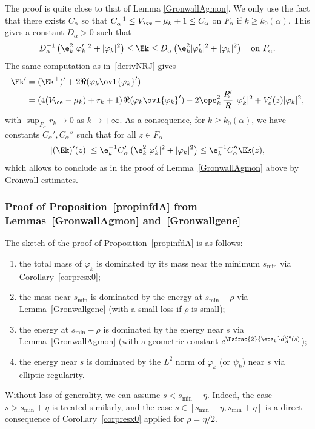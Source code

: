 \bnp
The proof is quite close to that of Lemma \ref{GronwallAgmon}. We only use the fact that there exists $C_{\alpha}$ so that $C_{\alpha}^{-1}\leq V_\ce -\mu_k+1\leq C_{\alpha}$ on $F_\alpha$ if $k\geq k_{0}(\alpha)$. This gives a constant $D_\alpha>0$ such that
\[
D_{\alpha}^{-1} \left( \e_k^{2}|\varphi_k'|^{2}+|\varphi_k|^{2}\right)\leq \Ek\leq D_{\alpha} \left(\e_k^{2} |\varphi_k'|^{2}+|\varphi_k|^{2}\right)\quad \text{on }F_\alpha.
\]
The same computation as in~\eqref{derivNRJ} gives
\begin{align*}
\Ek'& =(\Ek^+)'+2\Re(\varphi_k \ovl{\varphi_k}' ) \\
& =\left(4(V_{\ce} -\mu_k) + r_k+1\right) \Re(\varphi_k \ovl{\varphi_k}' ) - 2\eps_k^2\, \frac{R'}{R}\,|\varphi_k'|^2+ V'_c(z)|\varphi_k|^2,
\end{align*}
with $\sup_{F_\alpha}r_k \to 0$ as $k \to+ \infty$.
As a consequence, for $k\geq k_{0}(\alpha)$, we have constants $C_\alpha',C_\alpha''$ such that for all $z\in F_\alpha$
\[
|(\Ek)'(z)|\leq \e_k^{-1}C_{\alpha}' \left(\e_k^{2} |\varphi_k'|^{2}+|\varphi_k|^{2}\right)\leq \e_k^{-1} C_{\alpha}''\Ek(z),
\]
which allows to conclude as in the proof of Lemma~\ref{GronwallAgmon} above by Grönwall estimates.
\enp

\subsubsection{Proof of Proposition~\ref{propinfdA} from Lemmas~\ref{GronwallAgmon} and~\ref{Gronwallgene}}
The sketch of the proof of Proposition~\ref{propinfdA} is as follows: \begin{enumerate}
\item the total mass of $\varphi_k$ is dominated by its mass near the minimum $s_{\min}$ via Corollary~\ref{corpresx0};
\item the mass near $s_{\min}$ is dominated by the energy at $s_{\min}-\rho$ via Lemma~\ref{Gronwallgene} (with a small loss if $\rho$ is small);
\item the energy at $s_{\min}-\rho$ is dominated by the energy near $s$ via Lemma~\ref{GronwallAgmon} (with a geometric constant $e^{\Psfrac{2}{\eps_k}d_A^{\ce}(s)}$);
\item the energy near $s$ is dominated by the $L^2$ norm of $\varphi_k$ (or $\psi_k$) near $s$ via elliptic regularity.
\end{enumerate}
Without loss of generality, we can assume $s<s_{\min}-\eta$. Indeed, the case $s>s_{\min}+\eta$ is treated similarly, and the case $s\in [s_{\min}-\eta, s_{\min}+\eta]$ is a direct consequence of Corollary~\ref{corpresx0} applied for $\rho = \eta/2$.

